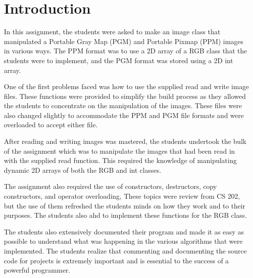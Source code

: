 \documentclass[pdftex, 11pt]{article}
\begin{document}


\pagestyle{fancy}
\renewcommand{\sectionmark}[1]{\markright{\thesection}}
\lhead{}
\cfoot{}
\renewcommand{\footrulewidth}{0.4pt}

\tableofcontents

\listoffigures
\newpage

\cfoot{}
\renewcommand{\footrulewidth}{0.4pt}

\section{Introduction}

In this assignment, the students were asked to make an image class that manipulated a Portable Gray Map (PGM) and
Portable Pixmap (PPM) images in various ways. The PPM format was to use a 2D array of a RGB class that the students were to
implement, and the PGM format was stored using a 2D int array.

One of the first problems faced was how to use the supplied read and write image files.  These functions were provided
to simplify the build process as they allowed the students to concentrate on the manipulation of the images. These files
were also changed slightly to accommodate the PPM and PGM file formats and were overloaded to accept either file.

After reading and writing images was mastered, the students undertook the bulk of the assignment which was to manipulate
the images that had been read in with the supplied read function. This required the knowledge of manipulating dynamic 2D
arrays of both the RGB and int classes. 

The assignment also required the use of constructors, destructors, copy constructors, and operator overloading, These
topics were review from CS 202, but the use of them refreshed the students minds on how they work and to their purposes.
The students also ahd to implement these functions for the RGB class.

The students also extensively documented their program and made it as easy as possible to understand what was happening
in the various algorithms that were implemented. The students realize that commenting and documenting the source code
for projects is extremely important and is essential to the success of a powerful programmer.
\end{document}
